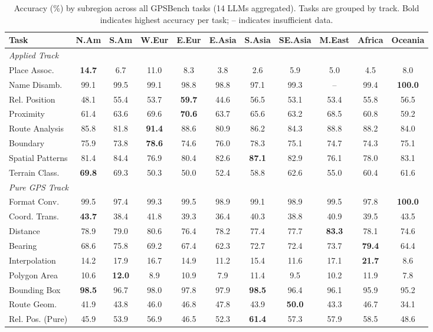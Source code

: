 \begin{table}[htbp]
\centering
\caption{Accuracy (\%) by subregion across all GPSBench tasks (14 LLMs aggregated). Tasks are grouped by track. Bold indicates highest accuracy per task; -- indicates insufficient data.}
\label{tab:regional_all_tasks_comprehensive}
\small
\begin{tabular}{lcccccccccc}
\toprule
\textbf{Task} & \textbf{N.Am} & \textbf{S.Am} & \textbf{W.Eur} & \textbf{E.Eur} & \textbf{E.Asia} & \textbf{S.Asia} & \textbf{SE.Asia} & \textbf{M.East} & \textbf{Africa} & \textbf{Oceania} \\
\midrule
\multicolumn{11}{l}{\textit{Applied Track}} \\
Place Assoc. & \textbf{14.7} & 6.7 & 11.0 & 8.3 & 3.8 & 2.6 & 5.9 & 5.0 & 4.5 & 8.0 \\
Name Disamb. & 99.1 & 99.5 & 99.1 & 98.8 & 98.8 & 97.1 & 99.3 & -- & 99.4 & \textbf{100.0} \\
Rel. Position & 48.1 & 55.4 & 53.7 & \textbf{59.7} & 44.6 & 56.5 & 53.1 & 53.4 & 55.8 & 56.5 \\
Proximity & 61.4 & 63.6 & 69.6 & \textbf{70.6} & 63.7 & 65.6 & 63.2 & 68.5 & 60.8 & 59.2 \\
Route Analysis & 85.8 & 81.8 & \textbf{91.4} & 88.6 & 80.9 & 86.2 & 84.3 & 88.8 & 88.2 & 84.0 \\
Boundary & 75.9 & 73.8 & \textbf{78.6} & 74.6 & 76.0 & 78.3 & 75.1 & 74.7 & 74.3 & 75.1 \\
Spatial Patterns & 81.4 & 84.4 & 76.9 & 80.4 & 82.6 & \textbf{87.1} & 82.9 & 76.1 & 78.0 & 83.1 \\
Terrain Class. & \textbf{69.8} & 69.3 & 50.3 & 50.0 & 52.4 & 58.8 & 62.6 & 55.0 & 60.4 & 61.6 \\
\midrule
\multicolumn{11}{l}{\textit{Pure GPS Track}} \\
Format Conv. & 99.5 & 97.4 & 99.3 & 99.5 & 98.9 & 99.1 & 98.9 & 99.5 & 97.8 & \textbf{100.0} \\
Coord. Trans. & \textbf{43.7} & 38.4 & 41.8 & 39.3 & 36.4 & 40.3 & 38.8 & 40.9 & 39.5 & 43.5 \\
Distance & 78.9 & 79.0 & 80.6 & 76.4 & 78.2 & 77.4 & 77.7 & \textbf{83.3} & 78.1 & 74.6 \\
Bearing & 68.6 & 75.8 & 69.2 & 67.4 & 62.3 & 72.7 & 72.4 & 73.7 & \textbf{79.4} & 64.4 \\
Interpolation & 14.2 & 17.9 & 16.7 & 14.9 & 11.2 & 15.4 & 11.6 & 17.1 & \textbf{21.7} & 8.6 \\
Polygon Area & 10.6 & \textbf{12.0} & 8.9 & 10.9 & 7.9 & 11.4 & 9.5 & 10.2 & 11.9 & 7.8 \\
Bounding Box & \textbf{98.5} & 96.7 & 98.0 & 97.8 & 97.9 & \textbf{98.5} & 96.4 & 96.1 & 95.9 & 95.2 \\
Route Geom. & 41.9 & 43.8 & 46.0 & 46.8 & 47.8 & 43.9 & \textbf{50.0} & 43.3 & 46.7 & 34.1 \\
Rel. Pos. (Pure) & 45.9 & 53.9 & 56.9 & 46.5 & 52.3 & \textbf{61.4} & 57.3 & 57.9 & 58.5 & 48.6 \\
\bottomrule
\end{tabular}
\end{table}


